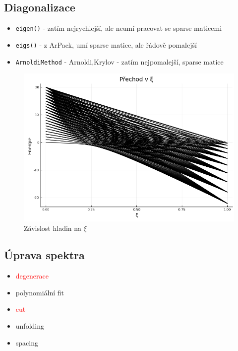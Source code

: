 \documentclass{article}
\begin{document}
\subsection{Diagonalizace}
\begin{itemize}
    \item \texttt{eigen()} - zatím nejrychlejší, ale neumí pracovat se sparse maticemi
    \item \texttt{eigs()} - z ArPack, umí sparse matice, ale řádově pomalejší
    \item \texttt{ArnoldiMethod} - Arnoldi,Krylov - zatím nejpomalejší, sparse matice
\end{itemize}


\begin{figure}[H]
    \centering
    \includegraphics[width=.75\linewidth]{levels.png}
    \caption{Závislost hladin na $\xi$}
\end{figure}

\subsection{Úprava spektra}

\begin{itemize}
    \item \textcolor{red}{degenerace}
    \item polynomiální fit
    \item \textcolor{red}{cut}
    \item unfolding
    \item spacing
\end{itemize}
\end{document}
